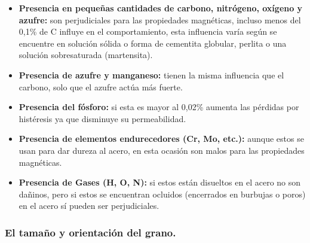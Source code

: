 \documentclass[12pt,a4paper]{article}
\begin{document}
\begin{itemize}
    \item \textbf{Presencia en pequeñas cantidades de carbono, nitrógeno, oxígeno y azufre:} son perjudiciales para las propiedades magnéticas, incluso menos del 0,1\% de C influye en el comportamiento, esta influencia varía según se encuentre en solución sólida o forma de cementita globular, perlita o una solución sobresaturada (martensita).
    \item \textbf{Presencia de azufre y manganeso:}  tienen la misma influencia que el carbono, solo que el azufre actúa más fuerte.
    \item \textbf{Presencia del fósforo:} si esta es mayor al 0,02\% aumenta las pérdidas por histéresis ya que disminuye su permeabilidad.
    \item \textbf{Presencia de elementos endurecedores (Cr, Mo, etc.):} aunque estos se usan para dar dureza al acero, en esta ocasión son malos para las propiedades magnéticas.
    \item \textbf{Presencia de Gases (H, O, N):} si estos están disueltos en el acero no son dañinos, pero si estos se encuentran ocluidos (encerrados en burbujas o poros) en el acero sí pueden ser perjudiciales.
\end{itemize}

\subsubsection{El tamaño y orientación del grano.}
\end{document}
